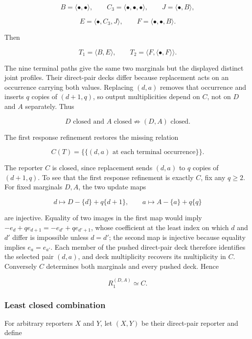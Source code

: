 \documentclass[11pt,a4paper]{article}
\begin{document}
\[B = \langle \bullet , \bullet \rangle,\quad\quad C_{3} = \langle \bullet , \bullet , \bullet \rangle,\quad\quad J = \langle \bullet ,B\rangle,\]

\[E = \langle \bullet ,C_{3},J\rangle,\quad\quad F = \langle \bullet , \bullet ,B\rangle.\]

Then

\[T_{1} = \langle B,E\rangle,\quad\quad T_{2} = \langle F,\langle \bullet ,F\rangle\rangle.\]

The nine terminal paths give the same two marginals but the displayed
distinct joint profiles. Their direct-pair decks differ because
replacement acts on an occurrence carrying both values. Replacing
\((d,a)\) removes that occurrence and inserts \(q\) copies of
\((d + 1,q)\), so output multiplicities depend on \(C\), not on \(D\)
and \(A\) separately. Thus

\[D\text{ closed and }A\text{ closed} \nRightarrow (D,A)\text{ closed}.\]

The first response refinement restores the missing relation

\[C(T) = \{\{(d,a)\text{ at each terminal occurrence}\}\}.\]

The reporter \(C\) is closed, since replacement sends \((d,a)\) to \(q\)
copies of \((d + 1,q)\). To see that the first response refinement is
exactly \(C\), fix any \(q \geq 2\). For fixed marginals \(D,A\), the
two update maps

\[d \mapsto D - \{ d\} + q\{ d + 1\},\quad\quad a \mapsto A - \{ a\} + q\{ q\}\]

are injective. Equality of two images in the first map would imply
\(- e_{d} + qe_{d + 1} = - e_{d\prime} + qe_{d\prime + 1}\), whose
coefficient at the least index on which \(d\) and \(d\prime\) differ is
impossible unless \(d = d\prime\); the second map is injective because
equality implies \(e_{a} = e_{a\prime}\). Each member of the pushed
direct-pair deck therefore identifies the selected pair \((d,a)\), and
deck multiplicity recovers its multiplicity in \(C\). Conversely \(C\)
determines both marginals and every pushed deck. Hence

\[R_{1}^{(D,A)} \simeq C.\]

\subsubsection{Least closed
combination}

For arbitrary reporters \(X\) and \(Y\), let \((X,Y)\) be their
direct-pair reporter and define
\end{document}
